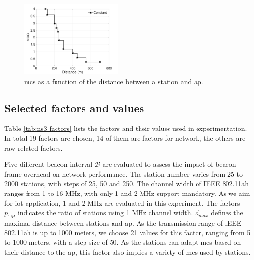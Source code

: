 \begin{figure}[t]
  \centering
  \includegraphics[width=0.45\textwidth]{image/distance-datarate}  \caption{\gls{mcs} as a function of the distance between a station and \gls{ap}. \label{fig:dist-datarate}}
\end{figure}




\subsection{Selected factors and values}

 Table \ref{tab:ns3 factors} lists the factors and their values used in experimentation. In total 19 factors are chosen, 14 of them are factors for network, the others are \gls{raw} related factors.


Five different beacon interval $\mathcal{B}$ are evaluated to assess the impact of beacon frame overhead on network performance. The station number varies from 25 to 2000 stations, with steps of 25, 50 and 250.
The channel width of IEEE 802.11ah ranges from 1 to  16 MHz, with only 1 and 2 MHz support mandatory. As we aim for \gls{iot} application, 1 and 2 MHz are evaluated in this experiment. The factors $p_\textit{1M}$ indicates the ratio of stations using 1 MHz channel width.
$d_\textit{max}$ defines the maximal distance between stations and \gls{ap}. As the transmission range of IEEE 802.11ah is up to 1000 meters, we choose 21 values for this factor, ranging from 5 to 1000 meters, with a step size of 50. As the stations can adapt \gls{mcs} based on their distance to the \gls{ap}, this factor also implies a variety of \gls{mcs} used by stations.

